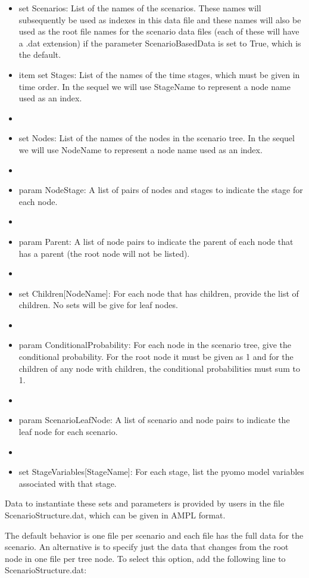 \begin{itemize}
\item set Scenarios: List of the names of the scenarios. These names will subsequently be used as indexes in this data file and these names will
also be used as the root file names for the scenario data files (each of these will have a .dat extension) if the 
parameter ScenarioBasedData is set to True, which is the default. 
\item[]
item set Stages: List of the names of the time stages, which must be given in time order. In the sequel we will use {\sc StageName} to represent a node name used
as an index.
\item[]
\item set Nodes: List of the names of the nodes in the scenario tree. In the sequel we will use {\sc NodeName} to represent a node name used
as an index.
\item[]
\item param NodeStage: A list of pairs of nodes and stages to indicate the stage for each node.
\item[]
\item param Parent: A list of node pairs to indicate the parent of each node that has a parent (the root node will not be listed).
\item[]
\item set Children[{\sc NodeName}]: For each node that has children, provide the list of children. No sets will be give for leaf nodes.
\item[]
\item param ConditionalProbability: For each node in the scenario tree, give the conditional probability. For the root node it must be given as 1 and for
the children of any node with children, the conditional probabilities must sum to 1.
\item[]
\item param ScenarioLeafNode: A list of scenario and node pairs to indicate the leaf node for each scenario.
\item[]
\item set StageVariables[{\sc StageName}]: For each stage, list the pyomo model variables associated with that stage.
\end{itemize}

Data
to instantiate these sets and parameters is provided by users in the file ScenarioStructure.dat, which can be given in AMPL \cite{ampl} format. 

The default behavior is one file per scenario and each file has the full data for the scenario. An
alternative is to specify just the data that changes from the root node in one file per tree node.
To select this option, add the following line to ScenarioStructure.dat:

